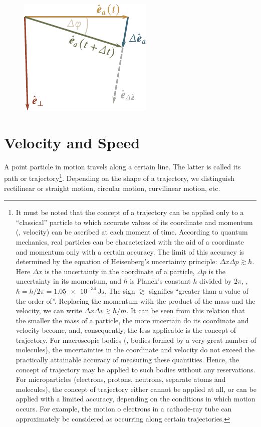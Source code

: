 \begin{figure}[t]
	\begin{center}
		\includegraphics[scale=0.95]{figures/ch_01/fig_1_19.pdf}
		\caption[]{}
		\label{fig:1_19}
	\end{center}
	\vspace{-0.7cm}
\end{figure}

\section{Velocity and Speed}\label{sec:1_3}

A point particle in motion travels along a certain line. The latter is called its path or trajectory\footnote{It must be noted that the concept of a trajectory can be applied only to a ``classical'' particle to which accurate values of its coordinate and momentum (\ie, velocity) can be ascribed at each moment of time. According to quantum mechanics, real particles can be characterized with the aid of a coordinate and momentum only with a certain accuracy. The limit of this accuracy is determined by the equation of Heisenberg's uncertainty principle: $\Delta x\Delta p\gtrsim\hbar$. Here $\Delta x$ is the uncertainty in the coordinate of a particle, $\Delta p$ is the uncertainty in its momentum, and $\hbar$ is Planck's constant $h$ divided by $2\pi$, \ie, $\hbar = h/2\pi = \SI{1.05e-34}{\joule\second}$. The sign $\gtrsim$ signifies ``greater than a value of the order of''. Replacing the momentum with the product of the mass and the velocity, we can write $\Delta x\Delta v\gtrsim\hbar/m$. It can be seen from this relation that the smaller the mass of a particle, the more uncertain do its coordinate and velocity become, and, consequently, the less applicable is the concept of trajectory. For macroscopic bodies (\ie, bodies formed by a very great number of molecules), the uncertainties in the coordinate and velocity do not exceed the practically attainable accuracy of measuring these quantities. Hence, the concept of trajectory may be applied to such bodies without any reservations. For microparticles (electrons, protons, neutrons, separate atoms and molecules), the concept of trajectory either cannot be applied at all, or can be applied with a limited accuracy, depending on the conditions in which motion occurs. For example, the motion o electrons in a cathode-ray tube can approximately be considered as occurring along certain trajectories.}. Depending on the shape of a trajectory, we distinguish rectilinear or straight motion, circular motion, curvilinear motion, etc.

